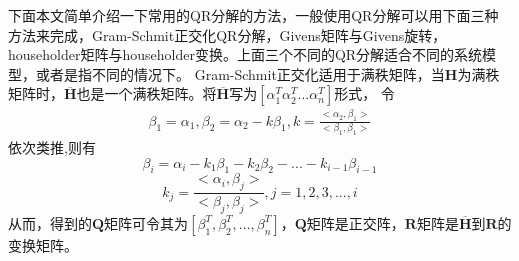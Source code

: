\documentclass[bachelor,nocolorlinks, printoneside]{seuthesis} %
\begin{document}
\begin{Main}
下面本文简单介绍一下常用的QR分解的方法，一般使用QR分解可以用下面三种方法来完成，Gram-Schmit正交化QR分解，Givens矩阵与Givens旋转，householder矩阵与householder变换。上面三个不同的QR分解适合不同的系统模型，或者是指不同的情况下。
Gram-Schmit正交化适用于满秩矩阵，当$\mathbf{H}$为满秩矩阵时，$\overline{\mathbf{H}}$也是一个满秩矩阵。将$\overline{\mathbf{H}}$写为$[\alpha_1^T \alpha_2^T ... \alpha_n^T]$形式，
令
\begin{eqnarray}\label{key}
\beta_1 = \alpha_1 , \beta_2 = \alpha_2 - k\beta_1 , k = \frac{<\alpha_2,\beta_1>}{<\beta_1,\beta_1>} \nonumber
\end{eqnarray}
依次类推,则有
\begin{equation}\label{key}
\beta_i = \alpha_i - k_1\beta_1 -k_2\beta_2 - ... - k_{i-1}\beta_{i-1} \nonumber
\end{equation}
\begin{equation}\label{key}
k_j = \frac{<\alpha_i,\beta_j>}{<\beta_j,\beta_j>}, j= 1,2,3,...,i \nonumber
\end{equation}
从而，得到的$\mathbf{Q}$矩阵可令其为$[\beta_1^T,\beta_2^T,...,\beta_n^T]$，$\mathbf{Q}$矩阵是正交阵，$\mathbf{R}$矩阵是$\overline{\mathbf{H}}$到$\mathbf{R}$的变换矩阵。\\


\end{Main}
\end{document}
